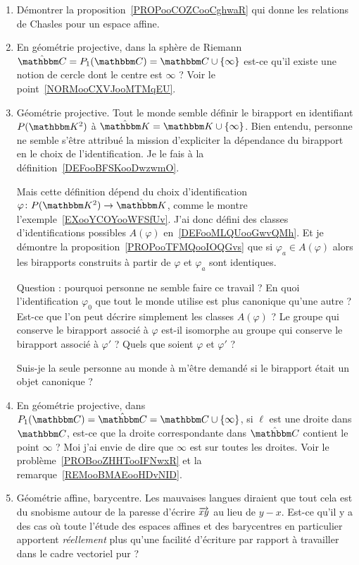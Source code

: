 \begin{enumerate}
    \item
        Démontrer la proposition~\ref{PROPooCOZCooCghwaR} qui donne les relations de Chasles pour un espace affine.
    \item
        En géométrie projective, dans la sphère de Riemann \( \hat\eC=P_1(\eC)=\eC\cup\{ \infty \}\) est-ce qu'il existe une notion de cercle dont le centre est \( \infty\) ? Voir le point~\ref{NORMooCXVJooMTMqEU}.
    \item
        Géométrie projective. Tout le monde semble définir le birapport en identifiant \( P(\eK^2)\) à \( \hat\eK=\eK\cup\{ \infty \}\). Bien entendu, personne ne semble s'être attribué la mission d'expliciter la dépendance du birapport en le choix de l'identification. Je le fais à la définition~\ref{DEFooBFSKooDwzwmO}.

        Mais cette définition dépend du choix d'identification \( \varphi\colon P(\eK^2)\to \hat\eK\), comme le montre l'exemple~\ref{EXooYCOYooWFSfUv}. J'ai donc défini des classes d'identifications possibles \( A(\varphi)\) en~\ref{DEFooMLQUooGwvQMh}. Et je démontre la proposition~\ref{PROPooTFMQooIOQGvs} que si \( \varphi_a\in A(\varphi)\) alors les birapports construits à partir de \( \varphi\) et \( \varphi_a\) sont identiques.

        Question : pourquoi personne ne semble faire ce travail ? En quoi l'identification \( \varphi_0\) que tout le monde utilise est plus canonique qu'une autre ? Est-ce que l'on peut décrire simplement les classes \( A(\varphi)\) ? Le groupe qui conserve le birapport associé à \( \varphi\) est-il isomorphe au groupe qui conserve le birapport associé à \( \varphi'\) ? Quels que soient \( \varphi\) et \( \varphi'\) ?

        Suis-je la seule personne au monde à m'être demandé si le birapport était un objet canonique ?
    \item
        En géométrie projective, dans \( P_1(\eC)=\hat\eC=\eC\cup\{ \infty \}\), si \( \ell\) est une droite dans \( \eC\), est-ce que la droite correspondante dans \( \hat\eC\) contient le point \( \infty\) ? Moi j'ai envie de dire que \( \infty\) est sur toutes les droites. Voir le problème~\ref{PROBooZHHTooIFNwxR} et la remarque~\ref{REMooBMAEooHDvNID}.

    \item
        Géométrie affine, barycentre. Les mauvaises langues diraient que tout cela est du snobisme autour de la paresse d'écrire \( \overrightarrow{ xy }\) au lieu de \( y-x\). Est-ce qu'il y a des cas où toute l'étude des espaces affines et des barycentres en particulier apportent \emph{réellement} plus qu'une facilité d'écriture par rapport à travailler dans le cadre vectoriel pur ?
\end{enumerate}


